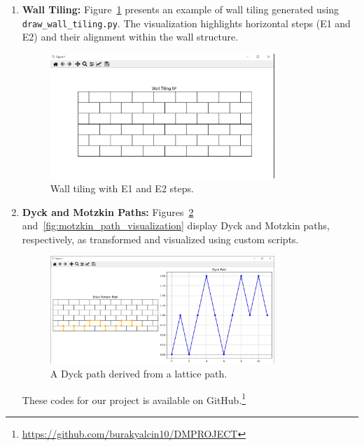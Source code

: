 \documentclass{article}
\begin{document}
\begin{enumerate}
    \item \textbf{Wall Tiling:}
    Figure~\ref{fig:wall_tiling} presents an example of wall tiling generated using \texttt{draw\_wall\_tiling.py}. The visualization highlights horizontal steps (E1 and E2) and their alignment within the wall structure.
    \begin{figure}[h]
        \centering
        \includegraphics[width=0.8\textwidth]{images/walltilling.jpg}
        \caption{Wall tiling with E1 and E2 steps.}
        \label{fig:wall_tiling}
    \end{figure}
    
    \item \textbf{Dyck and Motzkin Paths:}
    Figures~\ref{fig:dyck_path_visualization} and~\ref{fig:motzkin_path_visualization} display Dyck and Motzkin paths, respectively, as transformed and visualized using custom scripts.
    \begin{figure}[h]
        \centering
        \includegraphics[width=0.8\textwidth]{images/dyckpath.jpg}
        \caption{A Dyck path derived from a lattice path.}
        \label{fig:dyck_path_visualization}
    \end{figure}
    These codes for our project is available on GitHub.\footnote{\url{https://github.com/burakyalcin10/DMPROJECT}}
    

\end{enumerate}
\end{document}
